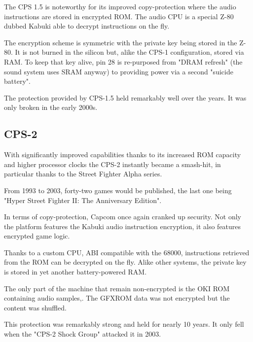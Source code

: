 The CPS 1.5 is noteworthy for its improved copy-protection where the audio instructions are stored in encrypted ROM. The audio CPU is a special Z-80 dubbed Kabuki\cite{arcadeHackerKabuki} able to decrypt instructions on the fly.

The encryption scheme is symmetric with the private key being stored in the Z-80. It is not burned in the silicon but, alike the CPS-1 configuration, stored via RAM. To keep that key alive, pin 28 is re-purposed from "DRAM refresh" (the sound system uses SRAM anyway) to providing power via a second "suicide battery". 





\begin{trivia}
The protection provided by CPS-1.5 held remarkably well over the years. It was only broken in the early 2000s\cite{ame_kabuki}.
\end{trivia}

\subsection{CPS-2}

With significantly improved capabilities thanks to its increased ROM capacity and higher processor clocks the CPS-2 instantly became a smash-hit, in particular thanks to the Street Fighter Alpha series. 

From 1993 to 2003, forty-two games would be published, the last one being "Hyper Street Fighter II: The Anniversary Edition".

In terms of copy-protection, Capcom once again cranked up security. Not only the platform features the Kabuki audio instruction encryption, it also features encrypted game logic. 

Thanks to a custom CPU, ABI compatible with the 68000, instructions retrieved from the ROM can be decrypted on the fly. Alike other systems, the private key is stored in yet another battery-powered RAM.

The only part of the machine that remain non-encrypted is the OKI ROM containing audio samples,. The GFXROM data was not encrypted but the content was shuffled.

\begin{trivia}
This protection was remarkably strong and held for nearly 10 years. It only fell when the "CPS-2 Shock Group" attacked it in 2003\cite{cps2rebirth}.
\end{trivia}



